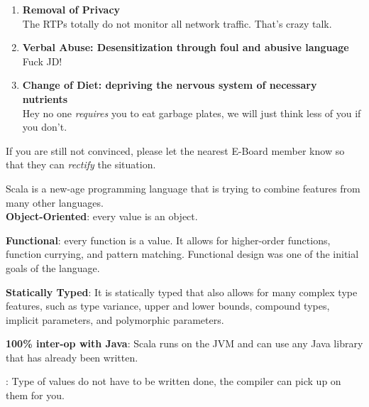 \documentclass[9pt]{extarticle} %
\begin{document}
\begin{minipage}[t]{.61\linewidth}
\begin{enumerate}
\item \textbf{Removal of Privacy} \\
The RTPs totally do not monitor all network traffic. That's crazy talk. 

\item \textbf{Verbal Abuse: Desensitization through foul and abusive language} \\
Fuck JD!

\item \textbf{Change of Diet: depriving the nervous system of necessary 
nutrients} \\
Hey no one \textit{requires} you to eat garbage plates, we will just think less
of you if you don't.


\end{enumerate}

If you are still not convinced, please let the nearest E-Board member know so
that they can \textit{rectify} the situation. 


\hypertarget{secondnews}{} 

Scala is a new-age programming language that is trying to combine features
from many other languages. \\

\textbf{Object-Oriented}: every value is an object.

\textbf{Functional}: every function is a value. It allows for higher-order
	functions, function currying, and pattern matching. Functional design was one
	of the initial goals of the language.
	
\textbf{Statically Typed}: It is statically typed that also allows for many
	complex type features, such as type variance, upper and lower bounds, 
	compound types, implicit parameters, and polymorphic parameters.

\textbf{100\% inter-op with Java}: Scala runs on the JVM and can use any
	Java library that has already been written.

: Type of values do not have to be written done, the
	compiler can pick up on them for you.


\end{minipage} %
\end{document}
